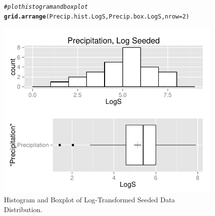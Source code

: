 \documentclass{article}\usepackage[]{graphicx}\usepackage[]{color}
\makeatletter
\def\maxwidth{ %
  \ifdim\Gin@nat@width>\linewidth
    \linewidth
  \else
    \Gin@nat@width
  \fi
}
\newcommand{\hlnum}[1]{\textcolor[rgb]{0.686,0.059,0.569}{#1}}%
\newcommand{\hlcom}[1]{\textcolor[rgb]{0.678,0.584,0.686}{\textit{#1}}}%
\newcommand{\hlstd}[1]{\textcolor[rgb]{0.345,0.345,0.345}{#1}}%
\newcommand{\hlkwc}[1]{\textcolor[rgb]{0.333,0.667,0.333}{#1}}%
\newcommand{\hlkwd}[1]{\textcolor[rgb]{0.737,0.353,0.396}{\textbf{#1}}}%
\newenvironment{kframe}{%
 \def\at@end@of@kframe{}%
 \ifinner\ifhmode%
  \def\at@end@of@kframe{\end{minipage}}%
  \begin{minipage}{\columnwidth}%
 \fi\fi%
 \def\FrameCommand##1{\hskip\@totalleftmargin \hskip-\fboxsep
 \colorbox{shadecolor}{##1}\hskip-\fboxsep
     \hskip-\linewidth \hskip-\@totalleftmargin \hskip\columnwidth}%
 \MakeFramed {\advance\hsize-\width
   \@totalleftmargin\z@ \linewidth\hsize
   \@setminipage}}%
 {\par\unskip\endMakeFramed%
 \at@end@of@kframe}
\newenvironment{knitrout}{}{} %
\makeatother
\begin{document}
\begin{figure}[H]  \begin{center}
\begin{knitrout}
\color{fgcolor}\begin{kframe}
\begin{alltt}
\hlcom{# plot histogram and boxplot}
\hlkwd{grid.arrange}\hlstd{(Precip.hist.LogS, Precip.box.LogS,} \hlkwc{nrow} \hlstd{=} \hlnum{2}\hlstd{)}
\end{alltt}
\end{kframe}
\includegraphics[width=\maxwidth]{figure/1a_data_LogS_plot} 

\end{knitrout}
\end{center} \caption{Histogram and Boxplot of Log-Transformed Seeded Data Distribution.} \end{figure}
\end{document}
